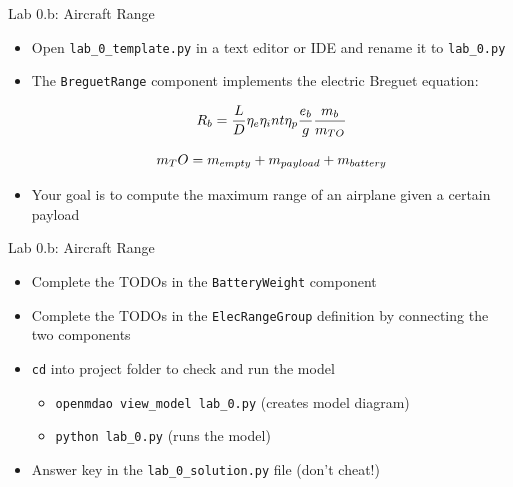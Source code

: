 \documentclass[aspectratio=169, usenames,dvipsnames, 14pt]{beamer}
\begin{document}

\begin{frame}{Lab 0.b: Aircraft Range}
    \begin{itemize}
        \item Open \texttt{lab\_0\_template.py} in a text editor or IDE and rename it to \texttt{lab\_0.py}
        
        \item The \texttt{BreguetRange} component implements the electric Breguet equation: 
        
        \begin{equation}
          \small R_b= \frac{L}{D}\eta_e \eta_int \eta_p \frac{e_b}{g} \frac{m_b}{m_{TO}} 
        \end{equation}
        
        \begin{equation}
          \small m_TO = m_{empty} + m_{payload} + m_{battery}
        \end{equation}
        
        \item Your goal is to compute the maximum range of an airplane given a certain payload
    \end{itemize}
\end{frame}


\begin{frame}{Lab 0.b: Aircraft Range}
    \begin{itemize}
        \item Complete the TODOs in the \texttt{BatteryWeight} component
        \vspace{0.3cm}
        \item Complete the TODOs in the \texttt{ElecRangeGroup} definition by connecting the two components
        \vspace{0.3cm}
        \item \texttt{cd} into project folder to check and run the model
            \begin{itemize}
                \item \texttt{openmdao view\_model lab\_0.py}  (creates model diagram)
                \item \texttt{python lab\_0.py}               (runs the model)
            \end{itemize}
            \vspace{0.3cm}
        \item Answer key in the \texttt{lab\_0\_solution.py} file (don’t cheat!)
    \end{itemize}
\end{frame}
\end{document}
